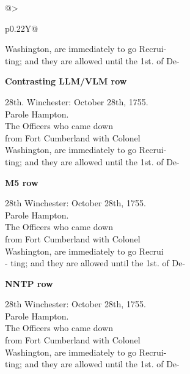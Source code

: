 \begin{table}[p]
\begin{tabularx}{\linewidth}{@{}>{\raggedright\arraybackslash}p{0.22\linewidth}Y@{}}
\begin{minipage}[t]{\hsize}
{      Washington, are immediately to go Recrui-\excerptnl\\
      ting; and they are allowed until the 1st. of De-\par}
      \vspace{0.3em}
      \textbf{Contrasting LLM/VLM row}\par
      {\raggedright\ttfamily
      28th. Winchester: October 28th, 1755.\excerptnl\\
      Parole Hampton.\excerptnl\\
      The Officers who came down\excerptnl\\
      from Fort Cumberland with Colonel\excerptnl\\
      Washington, are immediately to go Recrui-\excerptnl\\
      ting; and they are allowed until the 1st. of De-\par}
      \vspace{0.3em}
	      \textbf{M5 row}\par
	      {\raggedright\ttfamily
	      28th Winchester: October 28th, 1755.\excerptnl\\
      Parole Hampton.\excerptnl\\
      The Officers who came down\excerptnl\\
	      from Fort Cumberland with Colonel\excerptnl\\
	      Washington, are immediately to go Recrui\excerptnl\\
	      - ting; and they are allowed until the 1st. of De-\par}
	      \vspace{0.3em}
	      \textbf{NNTP row}\par
	      {\raggedright\ttfamily
	      28th Winchester: October 28th, 1755.\excerptnl\\
	      Parole Hampton.\excerptnl\\
	      The Officers who came down\excerptnl\\
	      from Fort Cumberland with Colonel\excerptnl\\
	      Washington, are immediately to go Recrui-\excerptnl\\
	      ting; and they are allowed until the 1st. of De-\par}
	    \end{minipage}
	    \\
	    \bottomrule
	  \end{tabularx}
	\end{table}

